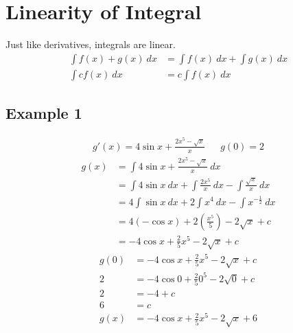\documentclass{article}
\theoremstyle{mytheoremstyle}
\theoremstyle{mytheoremstyle}
\theoremstyle{myproblemstyle}
\begin{document}
    \section*{Linearity of Integral}
    Just like derivatives, integrals are linear.
    \begin{align*}
        \int f(x)+g(x) \ dx &= \int f(x) \ dx + \int g(x) \ dx \\
        \int cf(x) \ dx &= c \int f(x) \ dx
    \end{align*}

    \subsection*{Example 1}
    \begin{align*}
        g'(x) = 4 \sin x + \frac{2x^5-\sqrt{x}}{x} && g(0)=2
    \end{align*}
    \begin{align*}
        g(x)&=\int 4 \sin x + \frac{2x^5-\sqrt{x}}{x} \ dx \\
        &= \int 4 \sin x \ dx + \int \frac{2x^5}{x} \ dx - \int \frac{\sqrt{x}}{x} \ dx \\
        &= 4\int \sin x \ dx + 2\int x^4 \ dx - \int x^{-\frac{1}{2}} \ dx \\
        &= 4(-\cos x) + 2(\frac{x^5}{5}) - 2\sqrt{x} + c \\
        &= -4\cos x + \frac{2}{5} x^5 -2\sqrt{x} + c
    \end{align*}
    \begin{align*}
        g(0) &= -4 \cos x + \frac{2}{5} x^5 - 2\sqrt{x} + c \\
        2    &= -4 \cos 0 + \frac{2}{5} 0^5 - 2\sqrt{0} + c \\
        2    &= -4 + c \\
        6    &= c \\
        g(x) &= -4\cos x + \frac{2}{5} x^5 -2\sqrt{x} + 6
    \end{align*}
\end{document}
